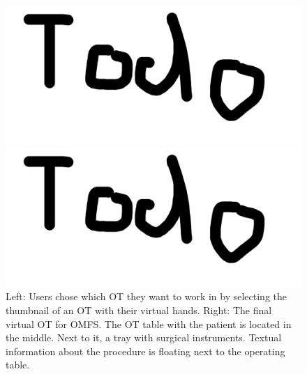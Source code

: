 \begin{figure}[ht]
  \centering
  \begin{minipage}{.5\textwidth}
    \centering
    \includegraphics[width=0.95\linewidth]{images/todo.png}
  \end{minipage}%
  \begin{minipage}{.5\textwidth}
    \centering
    \includegraphics[width=0.95\linewidth]{images/todo.png}
  \end{minipage}
  \caption{\label{fig::SceneSelect} Left: Users chose which OT they want to work in by selecting the thumbnail of an OT with their virtual hands. Right: The final virtual OT for OMFS. 
  The OT table with the patient is located in the middle. Next to it, a tray with surgical instruments.
  Textual information about the procedure is floating next to the operating table.}
\end{figure}

